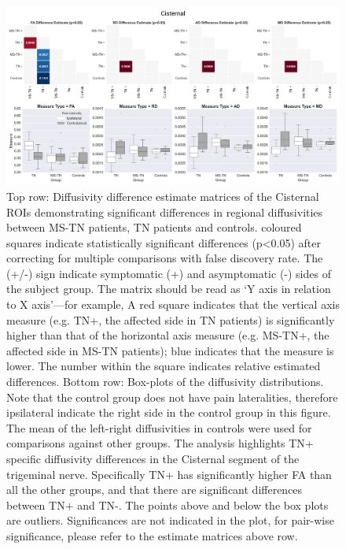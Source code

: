 \begin{figure}[p]
\includegraphics[width=\textwidth]{figure4.png}
\caption[Diffusivity difference estimate matrices of the Cisternal ROIs demonstrating significant differences in regional diffusivities between MS-TN patients, TN patients and controls.]{Top row: Diffusivity difference estimate matrices of the Cisternal ROIs demonstrating significant differences in regional diffusivities between MS-TN patients, TN patients and controls. coloured squares indicate statistically significant differences (p\textless 0.05) after correcting for multiple comparisons with false discovery rate. The (+/-) sign indicate symptomatic (+) and asymptomatic (-) sides of the subject group. The matrix should be read as ‘Y axis in relation to X axis’—for example, A red square indicates that the vertical axis measure (e.g. TN+, the affected side in TN patients) is significantly higher than that of the horizontal axis measure (e.g. MS-TN+, the affected side in MS-TN patients); blue indicates that the measure is lower. The number within the square indicates relative estimated differences. Bottom row: Box-plots of the diffusivity distributions. Note that the control group does not have pain lateralities, therefore ipsilateral indicate the right side in the control group in this figure. The mean of the left-right diffusivities in controls were used for comparisons against other groups. The analysis highlights TN+ specific diffusivity differences in the Cisternal segment of the trigeminal nerve. Specifically TN+ has significantly higher FA than all the other groups, and that there are significant differences between TN+ and TN-. The points above and below the box plots are outliers. Significances are not indicated in the plot, for pair-wise significance, please refer to the estimate matrices above row.}
\centering
\label{fig:MSfigure4}
\end{figure}

